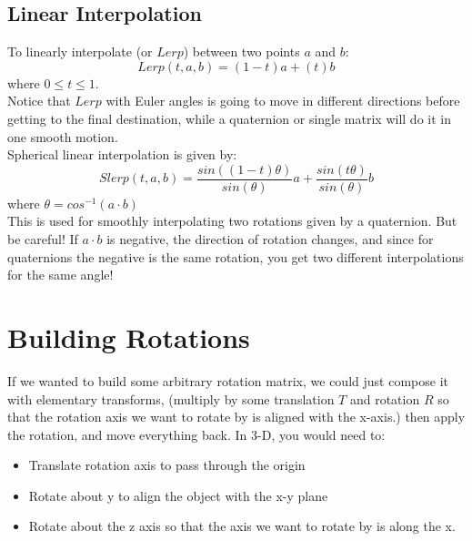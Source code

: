 \documentclass[12pt]{article}
\theoremstyle{definition}
\begin{document}
\subsection{Linear Interpolation}
To linearly interpolate (or $Lerp$) between two points $a$ and $b$:
$$ Lerp(t, a, b) = (1-t)a + (t)b$$
where $0\leq t \leq1$.
\\ \linebreak
Notice that $Lerp$ with Euler angles is going to move in different directions before getting to the final destination, while a quaternion or single matrix will do it in one smooth motion.
\\ \linebreak
Spherical linear interpolation is given by:
$$Slerp(t, a, b) = \frac{sin((1-t)\theta)}{sin(\theta)}a + \frac{sin(t\theta)}{sin(\theta)}b$$
where $ \theta = cos^{-1}(a\cdot b)$  \\ \linebreak
This is used for smoothly interpolating two rotations given by a quaternion. But be careful! If $a \cdot b$ is negative, the direction of rotation changes, and since for quaternions the negative is the same rotation, you get two different interpolations for the same angle!

\section{Building Rotations}
If we wanted to build some arbitrary rotation matrix, we could just compose it with elementary transforms, (multiply by some translation $T$ and rotation $R$ so that the rotation axis we want to rotate by is aligned with the x-axis.) then apply the rotation, and move everything back. In 3-D, you would need to:
\begin{itemize}
	\item Translate rotation axis to pass through the origin
	\item Rotate about y to align the object with the x-y plane
	\item Rotate about the z axis so that the axis we want to rotate by is along the x. 
\end{itemize}
\end{document}
